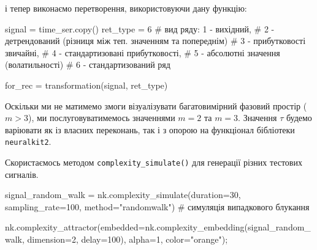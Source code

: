 \documentclass[
  letterpaper,
]{report}
\newenvironment{Shaded}{\begin{snugshade}}{\end{snugshade}}
\newcommand{\CommentTok}[1]{\textcolor[rgb]{0.37,0.37,0.37}{#1}}
\newcommand{\DecValTok}[1]{\textcolor[rgb]{0.68,0.00,0.00}{#1}}
\newcommand{\NormalTok}[1]{\textcolor[rgb]{0.00,0.23,0.31}{#1}}
\newcommand{\OperatorTok}[1]{\textcolor[rgb]{0.37,0.37,0.37}{#1}}
\newcommand{\StringTok}[1]{\textcolor[rgb]{0.13,0.47,0.30}{#1}}
\begin{document}
і тепер виконаємо перетворення, використовуючи дану функцію:

\begin{Shaded}
\begin{Highlighting}[]
\NormalTok{signal }\OperatorTok{=}\NormalTok{ time\_ser.copy()}
\NormalTok{ret\_type }\OperatorTok{=} \DecValTok{6}    \CommentTok{\# вид ряду: 1 {-} вихідний, }
                \CommentTok{\# 2 {-} детрендований (різниця між теп. значенням та попереднім)}
                \CommentTok{\# 3 {-} прибутковості звичайні, }
                \CommentTok{\# 4 {-} стандартизовані прибутковості, }
                \CommentTok{\# 5 {-} абсолютні значення (волатильності)}
                \CommentTok{\# 6 {-} стандартизований ряд}

\NormalTok{for\_rec }\OperatorTok{=}\NormalTok{ transformation(signal, ret\_type) }
\end{Highlighting}
\end{Shaded}

Оскільки ми не матимемо змоги візуалізувати багатовимірний фазовий
простір (\(m>3\)), ми послуговуватимемось значеннями \(m=2\) та \(m=3\).
Значення \(\tau\) будемо варіювати як із власних переконань, так і з
опорою на функціонал бібліотеки \texttt{neuralkit2}.

Скористаємось методом \texttt{complexity\_simulate()} для генерації
різних тестових сигналів.

\begin{Shaded}
\begin{Highlighting}[]
\NormalTok{signal\_random\_walk }\OperatorTok{=}\NormalTok{ nk.complexity\_simulate(duration}\OperatorTok{=}\DecValTok{30}\NormalTok{, }
\NormalTok{                                            sampling\_rate}\OperatorTok{=}\DecValTok{100}\NormalTok{, }
\NormalTok{                                            method}\OperatorTok{=}\StringTok{"randomwalk"}\NormalTok{) }\CommentTok{\# симуляція випадкового блукання}
\end{Highlighting}
\end{Shaded}

\begin{Shaded}
\begin{Highlighting}[]
\NormalTok{nk.complexity\_attractor(embedded}\OperatorTok{=}\NormalTok{nk.complexity\_embedding(signal\_random\_walk, dimension}\OperatorTok{=}\DecValTok{2}\NormalTok{, delay}\OperatorTok{=}\DecValTok{100}\NormalTok{), }
\NormalTok{                        alpha}\OperatorTok{=}\DecValTok{1}\NormalTok{, }
\NormalTok{                        color}\OperatorTok{=}\StringTok{"orange"}\NormalTok{)}\OperatorTok{;} 
\end{Highlighting}
\end{Shaded}
\end{document}
